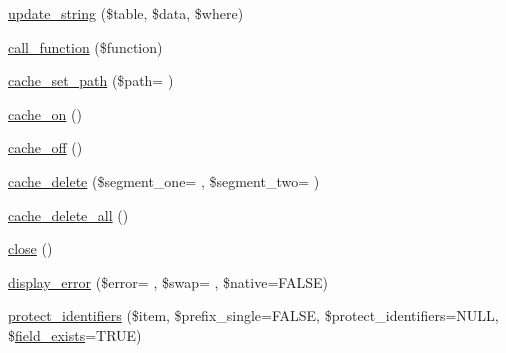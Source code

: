 \begin{DoxyCompactItemize}
\item 
\hyperlink{class_c_i___d_b__driver_af9eb76a74d10fa81e44ecb0dd9bf00d4}{update\+\_\+string} (\$table, \$data, \$where)
\item 
\hyperlink{class_c_i___d_b__driver_af7892f758c89d0e243def92140dbe099}{call\+\_\+function} (\$function)
\item 
\hyperlink{class_c_i___d_b__driver_a965799367e0e6a11b084f404dc86b631}{cache\+\_\+set\+\_\+path} (\$path= \textquotesingle{}\textquotesingle{})
\item 
\hyperlink{class_c_i___d_b__driver_a69ca9bb8bc31400922a565d5c4d64d8d}{cache\+\_\+on} ()
\item 
\hyperlink{class_c_i___d_b__driver_ae577e2be88cb5f0d184f76dc6fd87482}{cache\+\_\+off} ()
\item 
\hyperlink{class_c_i___d_b__driver_a0f0619e794ea34b9f763a49c032c8078}{cache\+\_\+delete} (\$segment\+\_\+one= \textquotesingle{}\textquotesingle{}, \$segment\+\_\+two= \textquotesingle{}\textquotesingle{})
\item 
\hyperlink{class_c_i___d_b__driver_a6e74f4d3938c78892f490b4f11faf318}{cache\+\_\+delete\+\_\+all} ()
\item 
\hyperlink{class_c_i___d_b__driver_aa69c8bf1f1dcf4e72552efff1fe3e87e}{close} ()
\item 
\hyperlink{class_c_i___d_b__driver_a3ed7f13afef7c8883ad5a025416a19e4}{display\+\_\+error} (\$error= \textquotesingle{}\textquotesingle{}, \$swap= \textquotesingle{}\textquotesingle{}, \$native=F\+A\+L\+S\+E)
\item 
\hyperlink{class_c_i___d_b__driver_ade8e28ac268bbe2f985c5359bc949f21}{protect\+\_\+identifiers} (\$item, \$prefix\+\_\+single=F\+A\+L\+S\+E, \$protect\+\_\+identifiers=N\+U\+L\+L, \$\hyperlink{class_c_i___d_b__driver_ad349ffee1eed59a2eb8f0f1d3033764f}{field\+\_\+exists}=T\+R\+U\+E)
\end{DoxyCompactItemize}
